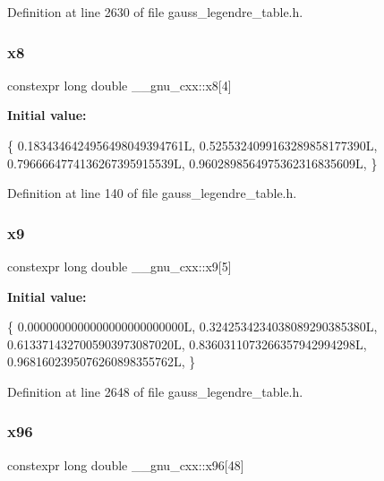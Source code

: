 Definition at line 2630 of file gauss\+\_\+legendre\+\_\+table.\+h.

\mbox{\label{namespace____gnu__cxx_ae20f2ba117285e47819e8fed2ac274bd}} 
\subsubsection{\texorpdfstring{x8}{x8}}
{\footnotesize\ttfamily constexpr long double \+\_\+\+\_\+gnu\+\_\+cxx\+::x8\mbox{[}4\mbox{]}}

{\bfseries Initial value\+:}
\begin{DoxyCode}
\{
    0.1834346424956498049394761L,
    0.5255324099163289858177390L,
    0.7966664774136267395915539L,
    0.9602898564975362316835609L,
  \}
\end{DoxyCode}


Definition at line 140 of file gauss\+\_\+legendre\+\_\+table.\+h.

\mbox{\label{namespace____gnu__cxx_a6477dcd8d66b656365b3f4da621566e0}} 
\subsubsection{\texorpdfstring{x9}{x9}}
{\footnotesize\ttfamily constexpr long double \+\_\+\+\_\+gnu\+\_\+cxx\+::x9\mbox{[}5\mbox{]}}

{\bfseries Initial value\+:}
\begin{DoxyCode}
\{
    0.0000000000000000000000000L,
    0.3242534234038089290385380L,
    0.6133714327005903973087020L,
    0.8360311073266357942994298L,
    0.9681602395076260898355762L,
  \}
\end{DoxyCode}


Definition at line 2648 of file gauss\+\_\+legendre\+\_\+table.\+h.

\mbox{\label{namespace____gnu__cxx_a519eff5db482d90d5e4f6d3e3d0b0885}} 
\subsubsection{\texorpdfstring{x96}{x96}}
{\footnotesize\ttfamily constexpr long double \+\_\+\+\_\+gnu\+\_\+cxx\+::x96\mbox{[}48\mbox{]}}



